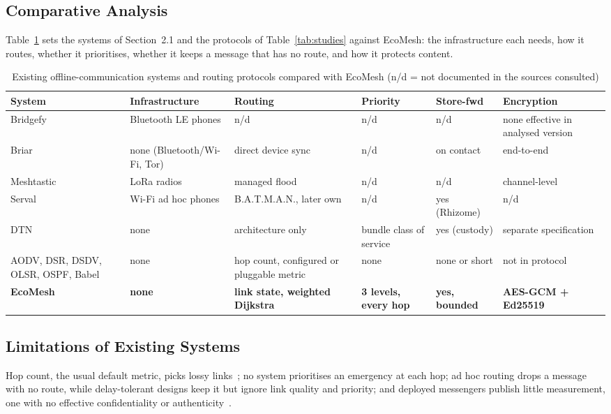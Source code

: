 \subsection{Comparative Analysis}
\label{sec:compare}
Table~\ref{tab:compare1} sets the systems of Section~2.1 and the protocols of Table~\ref{tab:studies} against EcoMesh: the infrastructure each needs, how it routes, whether it prioritises, whether it keeps a message that has no route, and how it protects content.
\begin{table}[!htbp]
\caption[Existing systems and routing protocols compared with EcoMesh]{Existing offline-communication systems and routing protocols compared with EcoMesh (n/d = not documented in the sources consulted)}
\label{tab:compare1}
\footnotesize
\begin{tabularx}{\textwidth}{@{}>{\raggedright\arraybackslash}p{2.1cm}>{\raggedright\arraybackslash}X>{\raggedright\arraybackslash}X>{\raggedright\arraybackslash}p{1.7cm}>{\raggedright\arraybackslash}p{1.9cm}>{\raggedright\arraybackslash}X@{}}
\toprule
\textbf{System} & \textbf{Infrastructure} & \textbf{Routing} & \textbf{Priority} & \textbf{Store-fwd} & \textbf{Encryption}\\ \midrule
Bridgefy & Bluetooth LE phones & n/d & n/d & n/d & none effective in analysed version~\cite{albrecht2021bridgefy}\\
Briar & none (Bluetooth/Wi-Fi, Tor) & direct device sync & n/d & on contact & end-to-end~\cite{briar}\\
Meshtastic & LoRa radios & managed flood~\cite{meshtastic} & n/d & n/d & channel-level\\
Serval & Wi-Fi ad hoc phones & B.A.T.M.A.N., later own & n/d & yes (Rhizome)~\cite{serval} & n/d\\
DTN & none & architecture only & bundle class of service & yes (custody) & separate specification\\
AODV, DSR, DSDV, OLSR, OSPF, Babel & none & hop count, configured or pluggable metric & none & none or short & not in protocol\\
\textbf{EcoMesh} & \textbf{none} & \textbf{link state, weighted Dijkstra} & \textbf{3 levels, every hop} & \textbf{yes, bounded} & \textbf{AES-GCM + Ed25519}\\
\bottomrule
\end{tabularx}
\end{table}

\subsection{Limitations of Existing Systems}
Hop count, the usual default metric, picks lossy links~\cite{decouto2003etx}; no system prioritises an emergency at each hop; ad hoc routing drops a message with no route, while delay-tolerant designs keep it but ignore link quality and priority; and deployed messengers publish little measurement, one with no effective confidentiality or authenticity~\cite{albrecht2021bridgefy}.
